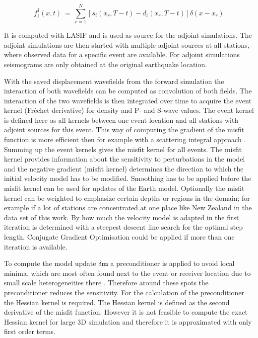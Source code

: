 \begin{equation}
f_i^{\dagger}(x,t) \ = \ \sum_{r=1}^N [ s_i(x_r, T-t) - d_i(x_r, T-t) ] \delta (x-x_r)
\end{equation}

It is computed with LASIF and is used as source for the adjoint simulations.
The adjoint simulations are then started with multiple adjoint sources at all stations, where observed data for a 
specific event are available. 
For adjoint simulations seismograms are only obtained at the original earthquake location.

%
%
With the saved displacement wavefields from the forward simulation the interaction of both wavefields can be computed as
convolution of both fields. 
The interaction of the two wavefields is then integrated over time to acquire the event kernel (Fr\'{e}chet derivative)
for density and P- and S-wave values. 
The event kernel is defined here as all kernels between one event location and all stations with adjoint sources for 
this event.
This way of computing the gradient of the misfit function is more efficient then for example with a scattering integral
approach \citep{Fichtner2006a}.
%
Summing up the event kernels gives the misfit kernel for all events.
The misfit kernel provides information about the sensitivity to perturbations in the model \citep{Magnoni2012}
and the negative gradient (misfit kernel) determines the direction to which the initial velocity model has to be modified. 
Smoothing has to be applied before the misfit kernel can be used for updates of the Earth model.
Optionally the misfit kernel can be weighted to emphasize certain depths or regions in the domain;
for example if a lot of stations are concentrated at one place like New Zealand in the data set of this work.
By how much the velocity model is adapted in the first iteration is determined with a steepest descent line
search for the optimal step length.
Conjugate Gradient Optimisation could be applied if more than one iteration is available.

To compute the model update $\delta \boldsymbol{m}$ a preconditioner is applied to avoid local minima, which are most
often found next to the event or receiver location due to small scale heterogeneities there \citep{Fichtner2009}.
Therefore around these spots the preconditioner reduces the sensitivity.
For the calculation of the preconditioner the Hessian kernel is required. 
The Hessian kernel is defined as the second derivative of the misfit function. 
However it is not feasible to compute the exact Hessian kernel for large 3D simulation and therefore
it is approximated with only first order terms.

